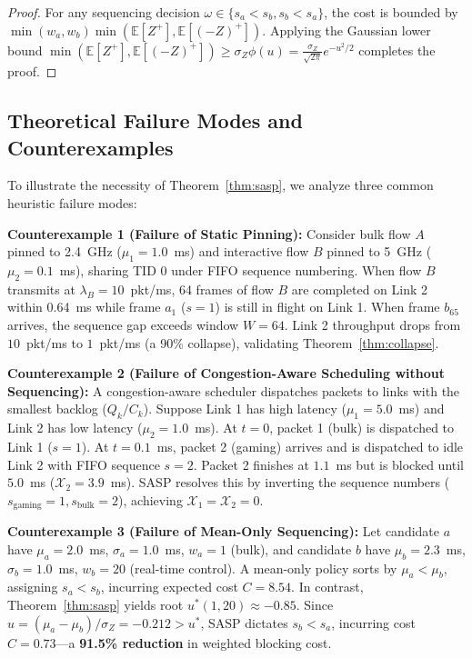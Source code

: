 \documentclass[10pt,journal,compsoc]{IEEEtran}
\begin{document}
\begin{proof}
For any sequencing decision $\omega \in \{s_a < s_b, s_b < s_a\}$, the cost is bounded by $\min(w_a, w_b) \min(\mathbb{E}[Z^+], \mathbb{E}[(-Z)^+])$. Applying the Gaussian lower bound $\min(\mathbb{E}[Z^+], \mathbb{E}[(-Z)^+]) \ge \sigma_Z \phi(u) = \frac{\sigma_Z}{\sqrt{2\pi}} e^{-u^2/2}$ completes the proof.
\end{proof}

\subsection{Theoretical Failure Modes and Counterexamples}
To illustrate the necessity of Theorem~\ref{thm:sasp}, we analyze three common heuristic failure modes:

\textbf{Counterexample 1 (Failure of Static Pinning):} Consider bulk flow $A$ pinned to 2.4~GHz ($\mu_1 = 1.0$~ms) and interactive flow $B$ pinned to 5~GHz ($\mu_2 = 0.1$~ms), sharing TID 0 under FIFO sequence numbering. When flow $B$ transmits at $\lambda_B = 10$~pkt/ms, 64 frames of flow $B$ are completed on Link 2 within 0.64~ms while frame $a_1$ ($s=1$) is still in flight on Link 1. When frame $b_{65}$ arrives, the sequence gap exceeds window $W = 64$. Link 2 throughput drops from $10$~pkt/ms to $1$~pkt/ms (a 90\% collapse), validating Theorem~\ref{thm:collapse}.

\textbf{Counterexample 2 (Failure of Congestion-Aware Scheduling without Sequencing):} A congestion-aware scheduler dispatches packets to links with the smallest backlog ($Q_k / C_k$). Suppose Link 1 has high latency ($\mu_1 = 5.0$~ms) and Link 2 has low latency ($\mu_2 = 1.0$~ms). At $t = 0$, packet 1 (bulk) is dispatched to Link 1 ($s=1$). At $t = 0.1$~ms, packet 2 (gaming) arrives and is dispatched to idle Link 2 with FIFO sequence $s=2$. Packet 2 finishes at $1.1$~ms but is blocked until $5.0$~ms ($\mathcal{X}_2 = 3.9$~ms). SASP resolves this by inverting the sequence numbers ($s_{\text{gaming}} = 1, s_{\text{bulk}} = 2$), achieving $\mathcal{X}_1 = \mathcal{X}_2 = 0$.

\textbf{Counterexample 3 (Failure of Mean-Only Sequencing):} Let candidate $a$ have $\mu_a = 2.0$~ms, $\sigma_a = 1.0$~ms, $w_a = 1$ (bulk), and candidate $b$ have $\mu_b = 2.3$~ms, $\sigma_b = 1.0$~ms, $w_b = 20$ (real-time control). A mean-only policy sorts by $\mu_a < \mu_b$, assigning $s_a < s_b$, incurring expected cost $C = 8.54$. In contrast, Theorem~\ref{thm:sasp} yields root $u^*(1, 20) \approx -0.85$. Since $u = (\mu_a - \mu_b)/\sigma_Z = -0.212 > u^*$, SASP dictates $s_b < s_a$, incurring cost $C = 0.73$---a \textbf{91.5\% reduction} in weighted blocking cost.
\end{document}
